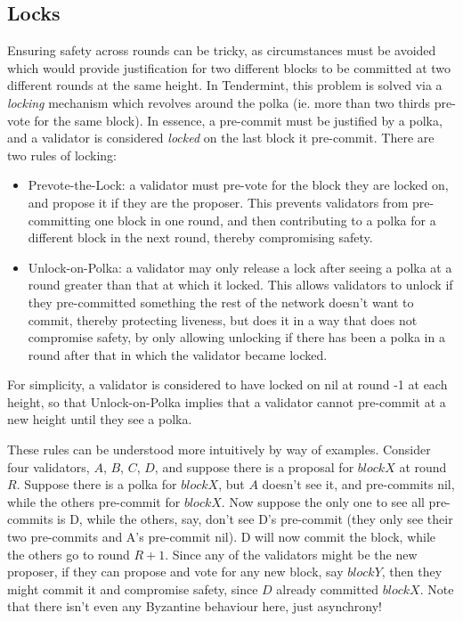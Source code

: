 \subsection{Locks}

Ensuring safety across rounds can be tricky, 
as circumstances must be avoided which would provide justification for two different blocks to be committed at two different rounds at the same height.
In Tendermint, this problem is solved via a \emph{locking} mechanism which revolves around the polka (ie. more than two thirds pre-vote for the same block).
In essence, a pre-commit must be justified by a polka, and a validator is considered \emph{locked} on the last block it pre-commit.
There are two rules of locking:

\begin{itemize}
\item{Prevote-the-Lock: a validator must pre-vote for the block they are locked on,
	and propose it if they are the proposer.	
	This prevents validators from pre-committing one block in one round, 
	and then contributing to a polka for a different block in the next round, 
	thereby compromising safety.}
\item{Unlock-on-Polka: a validator may only release a lock after seeing a polka 
	at a round greater than that at which it locked.
	This allows validators to unlock if they pre-committed something the rest of the network doesn't want to commit,
	thereby protecting liveness, but does it in a way that does not compromise safety,
	by only allowing unlocking if there has been a polka in a round after that in which the validator became locked.}
\end{itemize}


For simplicity, a validator is considered to have locked on nil at round -1 at each height, 
so that Unlock-on-Polka implies that a validator cannot pre-commit at a new height until they see a polka.

These rules can be understood more intuitively by way of examples. 
Consider four validators, $A$, $B$, $C$, $D$, and suppose there is a proposal for $blockX$ at round $R$. 
Suppose there is a polka for $blockX$, 
but $A$ doesn't see it, and pre-commits nil, 
while the others pre-commit for $blockX$.
Now suppose the only one to see all pre-commits is D, 
while the others, say, don't see D's pre-commit (they only see their two pre-commits and A's pre-commit nil).
D will now commit the block, while the others go to round $R+1$.
Since any of the validators might be the new proposer, 
if they can propose and vote for any new block, say $blockY$, 
then they might commit it and compromise safety, since $D$ already committed $blockX$.
Note that there isn't even any Byzantine behaviour here, just asynchrony!


